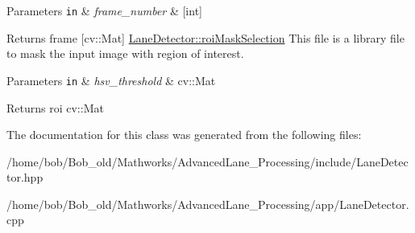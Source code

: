 \begin{DoxyParams}[1]{Parameters}
\mbox{\tt in}  & {\em frame\+\_\+number} & \mbox{[}int\mbox{]} \\
\hline
\end{DoxyParams}
\begin{DoxyReturn}{Returns}
frame \mbox{[}cv\+::\+Mat\mbox{]} \hyperlink{classLaneDetector_a5ad301b4756ae451f49b43947771c02f}{Lane\+Detector\+::roi\+Mask\+Selection} This file is a library file to mask the input image with region of interest.
\end{DoxyReturn}

\begin{DoxyParams}[1]{Parameters}
\mbox{\tt in}  & {\em hsv\+\_\+threshold} & cv\+::\+Mat \\
\hline
\end{DoxyParams}
\begin{DoxyReturn}{Returns}
roi cv\+::\+Mat 
\end{DoxyReturn}


The documentation for this class was generated from the following files\+:\begin{DoxyCompactItemize}
\item 
/home/bob/\+Bob\+\_\+old/\+Mathworks/\+Advanced\+Lane\+\_\+\+Processing/include/Lane\+Detector.\+hpp\item 
/home/bob/\+Bob\+\_\+old/\+Mathworks/\+Advanced\+Lane\+\_\+\+Processing/app/Lane\+Detector.\+cpp\end{DoxyCompactItemize}
